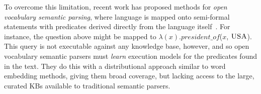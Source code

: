 \documentclass[11pt,letterpaper]{article}
\newcommand{\lexicalpredicate}[1]{\ensuremath{\textit{#1}}}
\newcommand{\formalpredicate}[1]{{\small \ensuremath{\textsc{#1}}}}
\begin{document}
To overcome this limitation, recent work has proposed methods for \emph{open
vocabulary semantic parsing}, where language is mapped onto semi-formal
statements with predicates derived directly from the language
itself~\cite{lewis-2013-combined-distributional-and-logical-semantics,%
krishnamurthy-2015-semparse-open-vocabulary}.  For instance, the question above
might be mapped to $\lambda(x).$\lexicalpredicate{president\_of}($x$,
\formalpredicate{USA}).  This query is not executable against any knowledge
base, however, and so open vocabulary semantic parsers must \emph{learn}
execution models for the predicates found in the text.  They do this with a
distributional approach similar to word embedding methods, giving them broad
coverage, but lacking access to the large, curated KBs available to traditional
semantic parsers.
\end{document}
